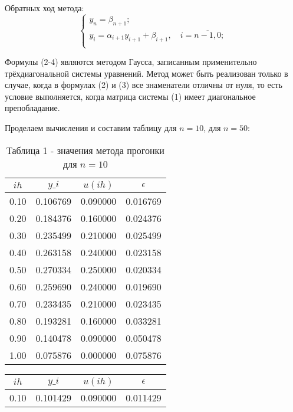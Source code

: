 \documentclass[a4paper,12pt]{article}
\begin{document}
{		Обратных ход метода:
		\begin{equation}
			\begin{cases}
				y_n = \beta_{n+1};\\
				y_i = \alpha_{i+1}y_{i+1} + \beta_{i+1}, \quad i = \overline{n-1, 0};\\
			\end{cases}
		\end{equation}
		
		Формулы (2-4) являются методом Гаусса, записанным применительно трёх\-диаго\-наль\-ной системы уравнений. 
		Метод может быть реализован только в случае, когда в формулах (2) и (3) все знаменатели отличны от нуля, 
		то есть условие выполняется, когда матрица системы (1) имеет диагональное препобладание.
		
		Проделаем вычисления и составим таблицу для $n = 10$, для $n = 50$:
		\begin{table}[h]
			\centering
			\begin{tabular}{|c|c|c|c|}
				\hline
				$ih$ & $y\_i$ & $u(ih)$ & $\epsilon$ \\
				\hline
				0.10 & 0.106769 & 0.090000 & 0.016769 \\
				\hline
				0.20 & 0.184376 & 0.160000 & 0.024376 \\
				\hline
				0.30 & 0.235499 & 0.210000 & 0.025499 \\
				\hline
				0.40 & 0.263158 & 0.240000 & 0.023158 \\
				\hline
				0.50 & 0.270334 & 0.250000 & 0.020334 \\
				\hline
				0.60 & 0.259690 & 0.240000 & 0.019690 \\
				\hline
				0.70 & 0.233435 & 0.210000 & 0.023435 \\
				\hline
				0.80 & 0.193281 & 0.160000 & 0.033281 \\
				\hline
				0.90 & 0.140478 & 0.090000 & 0.050478 \\
				\hline
				1.00 & 0.075876 & 0.000000 & 0.075876 \\
				\hline
			\end{tabular}
			\caption*{\small{Таблица 1 - значения метода прогонки для $n = 10$}}
		\end{table}
		\begin{table}[h]
			\centering
			\begin{tabular}{|c|c|c|c|}
				\hline
				$ih$ & $y\_i$ & $u(ih)$ & $\epsilon$ \\
				\hline
				0.10 & 0.101429 & 0.090000 & 0.011429 \\

\end{tabular}
\end{table}}
\end{document}
